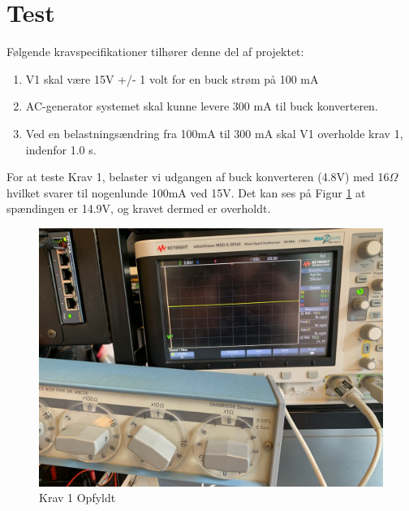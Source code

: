 \documentclass[../main.tex]{subfiles}
\begin{document}
\section{Test}
Følgende kravspecifikationer tilhører denne del af projektet:
\begin{enumerate}
  \item V1 skal være 15V +/- 1 volt for en buck strøm på 100 mA
  \item AC-generator systemet skal kunne levere 300 mA til buck konverteren.
  \item Ved en belastningsændring fra 100mA til 300 mA skal V1 overholde krav 1, indenfor 1.0 s.
\end{enumerate}

For at teste Krav 1, belaster vi udgangen af buck konverteren (4.8V) med 16$\Omega$ hvilket svarer til nogenlunde 100mA ved 15V. Det kan ses på Figur \ref{fig: Krav 1 Opfyldt} at spændingen er 14.9V, og kravet dermed er overholdt.
\begin{figure}[H]
      \includegraphics[width=\textwidth]{Dokumentation/Pictures/Krav1.jpg}
     \caption{Krav 1 Opfyldt}
     \label{fig: Krav 1 Opfyldt}
     \end{figure}
\end{document}

